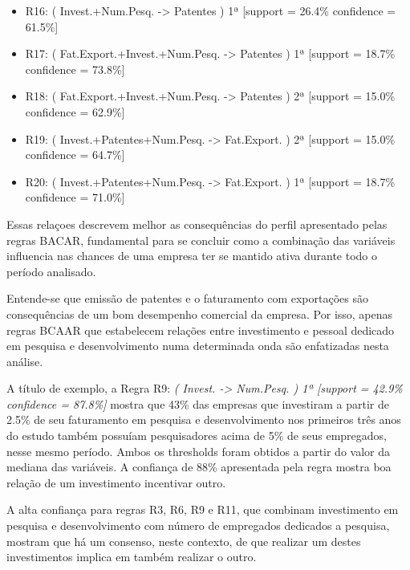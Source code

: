 \documentclass[kdmile,a4paper]{kdmile} %
\begin{document}
\begin{itemize}
    \item R16: ( Invest.+Num.Pesq. -> Patentes ) 1ª [support = 26.4\% confidence = 61.5\%]
    \item R17: ( Fat.Export.+Invest.+Num.Pesq. -> Patentes ) 1ª [support = 18.7\% confidence = 73.8\%]
    \item R18: ( Fat.Export.+Invest.+Num.Pesq. -> Patentes ) 2ª [support = 15.0\% confidence = 62.9\%]
    \item R19: ( Invest.+Patentes+Num.Pesq. -> Fat.Export. ) 2ª [support = 15.0\% confidence = 64.7\%]
    \item R20: ( Invest.+Patentes+Num.Pesq. -> Fat.Export. ) 1ª [support = 18.7\% confidence = 71.0\%]
\end{itemize}

Essas relaçoes descrevem melhor as consequências do perfil apresentado pelas regras BACAR, fundamental para se concluir como a combinação das variáveis influencia nas chances de uma empresa ter se mantido ativa durante todo o período analisado.

Entende-se que emissão de patentes e o faturamento com exportações são consequências de um bom desempenho comercial da empresa. Por isso, apenas regras BCAAR que estabelecem relações entre investimento e pessoal dedicado em pesquisa e desenvolvimento numa determinada onda são enfatizadas nesta análise.

A título de exemplo, a Regra R9: \textit{( Invest. -> Num.Pesq. ) 1ª [support = 42.9\% confidence = 87.8\%]} mostra que 43\% das empresas que investiram a partir de 2.5\% de seu faturamento em pesquisa e desenvolvimento nos primeiros três anos do estudo também possuíam pesquisadores acima de 5\% de seus empregados, nesse mesmo período. Ambos os thresholds foram obtidos a partir do valor da mediana das variáveis. A confiança de 88\% apresentada pela regra mostra boa relação de um investimento incentivar outro.

A alta confiança para regras R3, R6, R9 e R11, que combinam investimento em pesquisa e desenvolvimento com número de empregados dedicados a pesquisa, mostram que há um consenso, neste contexto, de que realizar um destes investimentos implica em também realizar o outro.
\end{document}
